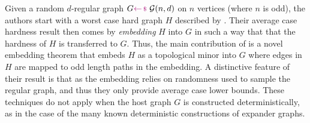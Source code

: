 \documentclass[11pt]{article}
\begin{document}
Given a random $d$-regular graph $G\samples \mathcal{G}(n, d)$ on $n$ vertices (where $n$ is odd), the authors start with a worst case hard graph $H$ described by \citet{buss1999linear}.
Their average case hardness result then comes by \emph{embedding} $H$ into $G$ in such a way that that the hardness of $H$ is transferred to $G$.
Thus, the main contribution of \citet{Austrin_2022} is a novel embedding theorem that embeds $H$ as a topological minor into $G $ where edges in $H$ are mapped to odd length paths in the embedding.
A distinctive feature of their result is that as the embedding relies on randomness used to sample the regular graph, and thus they only provide average case lower bounds.
These techniques do not apply when the host graph $G$ is constructed deterministically, as in the case of the many known deterministic constructions of expander graphs.
\end{document}
